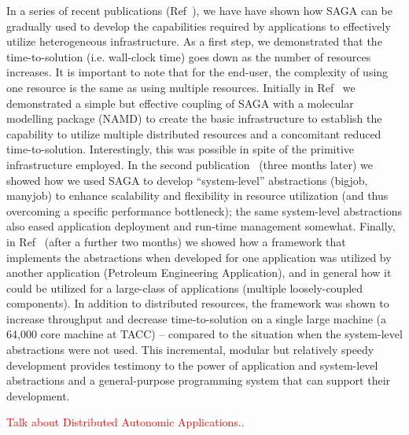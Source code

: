 \documentclass[10pt,letterpaper]{article}
\newcommand{\note}[1]{ {\textcolor{red}    { #1 }}}
\newcommand{\note}[1]{}
\begin{document}
In a series of recent publications (Ref~\cite{saga_escience08}\cite{saga_royalsoc}\cite{saga_iccs09}), we have have shown how SAGA can be gradually used to develop the capabilities required by applications to effectively utilize heterogeneous infrastructure. As a first step, we demonstrated that the time-to-solution (i.e. wall-clock time) goes down as the number of resources increases.  It is important to note that for the end-user, the complexity of using one resource is the same as using multiple resources.  Initially in Ref~\cite{saga_escience08} we demonstrated a simple but effective coupling of SAGA with a molecular modelling package (NAMD) to create the basic infrastructure to establish the capability to utilize multiple distributed resources and a concomitant reduced time-to-solution.  Interestingly, this was possible in spite of the primitive infrastructure employed. In the second publication~\cite{saga_royalsoc} (three months later) we showed how we used SAGA to develop ``system-level'' abstractions (bigjob, manyjob) to enhance scalability and flexibility in resource utilization (and thus overcoming a specific performance bottleneck); the same system-level abstractions also eased application deployment and run-time management somewhat.  Finally, in Ref~\cite{saga_iccs09} (after a further two months) we showed how a framework that implements the abstractions when developed for one application was utilized by another application (Petroleum Engineering Application), and in general how it could be utilized for a large-class of applications (multiple loosely-coupled components).  In addition to distributed resources, the framework was shown to increase throughput and decrease time-to-solution on a single large machine (a 64,000 core machine at TACC) -- compared to the situation when the system-level abstractions were not used.  This incremental, modular but relatively speedy development provides testimony to the power of application and system-level abstractions and a general-purpose programming system that can support their development.

\note{Talk about Distributed Autonomic Applications..}
\end{document}
